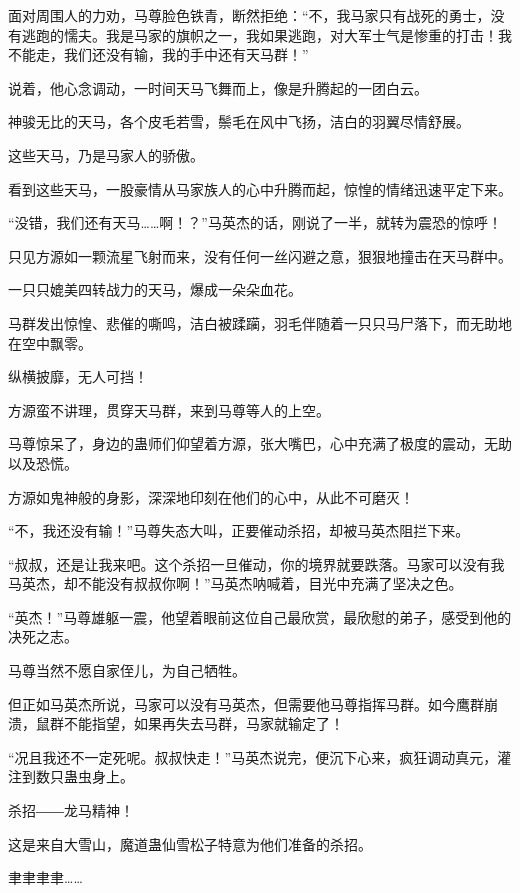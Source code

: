 
\begin{this_body}

面对周围人的力劝，马尊脸色铁青，断然拒绝：“不，我马家只有战死的勇士，没有逃跑的懦夫。我是马家的旗帜之一，我如果逃跑，对大军士气是惨重的打击！我不能走，我们还没有输，我的手中还有天马群！”

说着，他心念调动，一时间天马飞舞而上，像是升腾起的一团白云。

神骏无比的天马，各个皮毛若雪，鬃毛在风中飞扬，洁白的羽翼尽情舒展。

这些天马，乃是马家人的骄傲。

看到这些天马，一股豪情从马家族人的心中升腾而起，惊惶的情绪迅速平定下来。

“没错，我们还有天马……啊！？”马英杰的话，刚说了一半，就转为震恐的惊呼！

只见方源如一颗流星飞射而来，没有任何一丝闪避之意，狠狠地撞击在天马群中。

一只只媲美四转战力的天马，爆成一朵朵血花。

马群发出惊惶、悲催的嘶鸣，洁白被蹂躏，羽毛伴随着一只只马尸落下，而无助地在空中飘零。

纵横披靡，无人可挡！

方源蛮不讲理，贯穿天马群，来到马尊等人的上空。

马尊惊呆了，身边的蛊师们仰望着方源，张大嘴巴，心中充满了极度的震动，无助以及恐慌。

方源如鬼神般的身影，深深地印刻在他们的心中，从此不可磨灭！

“不，我还没有输！”马尊失态大叫，正要催动杀招，却被马英杰阻拦下来。

“叔叔，还是让我来吧。这个杀招一旦催动，你的境界就要跌落。马家可以没有我马英杰，却不能没有叔叔你啊！”马英杰呐喊着，目光中充满了坚决之色。

“英杰！”马尊雄躯一震，他望着眼前这位自己最欣赏，最欣慰的弟子，感受到他的决死之志。

马尊当然不愿自家侄儿，为自己牺牲。

但正如马英杰所说，马家可以没有马英杰，但需要他马尊指挥马群。如今鹰群崩溃，鼠群不能指望，如果再失去马群，马家就输定了！

“况且我还不一定死呢。叔叔快走！”马英杰说完，便沉下心来，疯狂调动真元，灌注到数只蛊虫身上。

杀招――龙马精神！

这是来自大雪山，魔道蛊仙雪松子特意为他们准备的杀招。

聿聿聿聿……


\end{this_body}
